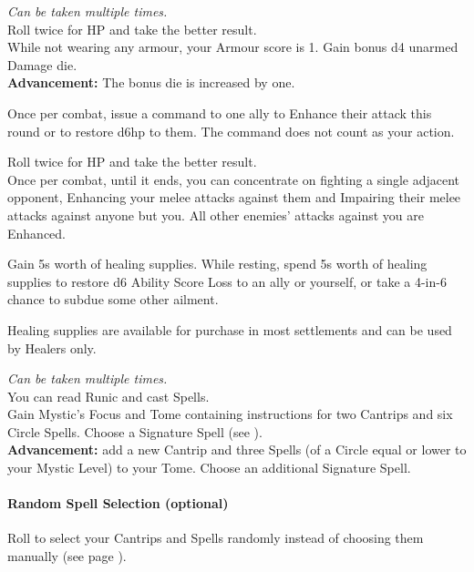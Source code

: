\documentclass[itdr]{subfiles}
\begin{document}
\vfill
{} {\slshape Can be taken multiple times.}\\
Roll twice for HP and take the better result.\\
While not wearing any armour, your Armour score is 1. Gain bonus d4 unarmed Damage die.\\
\textbf{Advancement:} The bonus die is increased by one.

\vfill
{}
Once per combat, issue a command to one ally to Enhance their attack this round or to restore d6hp to them. The command does not count as your action.

\break

 Roll twice for HP and take the better result.\\
Once per combat, until it ends, you can concentrate on fighting a single adjacent opponent, Enhancing your melee attacks against them and Impairing their melee attacks against anyone but you. All other \mbox{enemies'} attacks against you are Enhanced.

\vfill
{}
Gain 5s worth of healing supplies.
While resting, spend 5s worth of healing supplies to restore d6 Ability Score Loss to an ally or yourself, or take a 4-in-6 chance to subdue some other ailment.

Healing supplies are available for purchase in most settlements and can be used by Healers only.

\vfill
{}
 {\slshape Can be taken multiple times.}\\
You can read Runic and cast Spells.\\
Gain Mystic's Focus and Tome containing instructions for two Cantrips and six  Circle Spells. Choose a Signature Spell (see \textbf{}).\\
\textbf{Advancement:} add a new Cantrip and three Spells (of a Circle equal or lower to your Mystic Level) to your Tome. Choose an additional Signature Spell.
\begin{dbox}
	\paragraph{Random Spell Selection (optional)}
	Roll to select your Cantrips and Spells randomly instead of choosing them manually (see page \pageref{random_spells}).\vspace{-1em}
\end{dbox}
\end{document}

